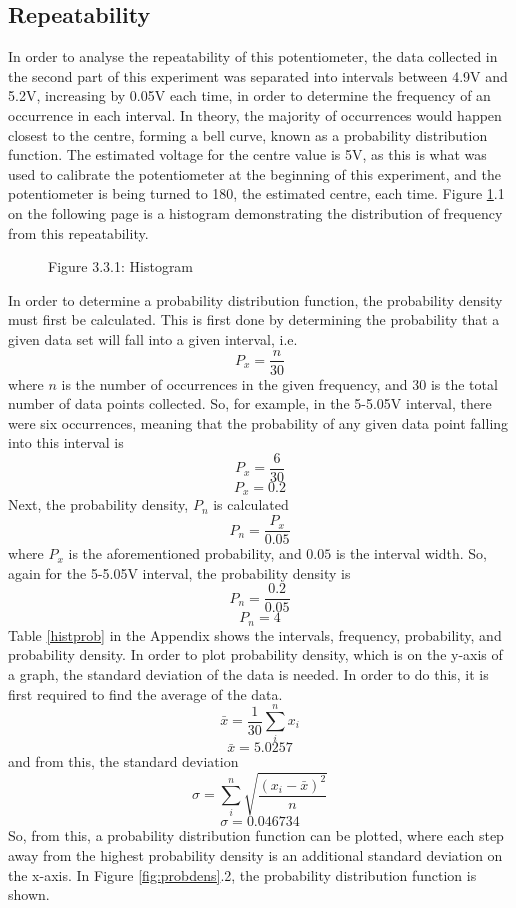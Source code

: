 \documentclass[a4,11pt]{article}
\begin{document}
\subsection{Repeatability}
In order to analyse the repeatability of this potentiometer, the data collected in the second part of this experiment was separated into intervals between 4.9V and 5.2V, increasing by 0.05V each time, in order to determine the frequency of an occurrence in each interval. In theory, the majority of occurrences would happen closest to the centre, forming a bell curve, known as a probability distribution function. The estimated voltage for the centre value is 5V, as this is what was used to calibrate the potentiometer at the beginning of this experiment, and the potentiometer is being turned to 180\degree, the estimated centre, each time. Figure \ref{fig:histogram}.1 on the following page is a histogram demonstrating the distribution of frequency from this repeatability.

\begin{figure}[h]
	\centering
	\label{fig:histogram}
	Figure 3.3.1: Histogram
\end{figure}

In order to determine a probability distribution function, the probability density must first be calculated. This is first done by determining the probability that a given data set will fall into a given interval, i.e.
$$P_x=\frac{n}{30}$$
where $n$ is the number of occurrences in the given frequency, and $30$ is the total number of data points collected. So, for example, in the 5-5.05V interval, there were six occurrences, meaning that the probability of any given data point falling into this interval is
$$P_x=\frac{6}{30}$$
$$P_x=0.2$$
Next, the probability density, $P_n$ is calculated
$$P_n=\frac{P_x}{0.05}$$
where $P_x$ is the aforementioned probability, and $0.05$ is the interval width. So, again for the 5-5.05V interval, the probability density is
$$P_n=\frac{0.2}{0.05}$$
$$P_n=4$$
Table \ref{histprob} in the Appendix shows the intervals, frequency, probability, and probability density.
In order to plot probability density, which is on the y-axis of a graph, the standard deviation of the data is needed. In order to do this, it is first required to find the average of the data.
$$\bar{x}=\frac{1}{30}\sum_{i}^{n}{x_i}$$
$$\bar{x}=5.0257$$
and from this, the standard deviation
$$\sigma=\sum_{i}^n{\sqrt{\frac{(x_i-\bar x)^2}{n}}}$$
$$\sigma=0.046734$$
So, from this, a probability distribution function can be plotted, where each step away from the highest probability density is an additional standard deviation on the x-axis. In Figure \ref{fig:probdens}.2, the probability distribution function is shown.
\end{document}

